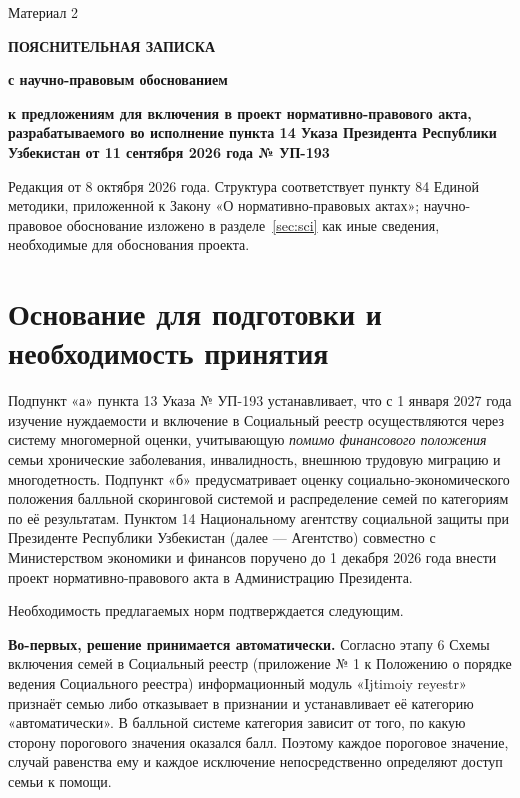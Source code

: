 \documentclass[14pt,a4paper]{extarticle}
\begin{document}
\begin{flushright}Материал 2\end{flushright}
\begin{center}\textbf{ПОЯСНИТЕЛЬНАЯ ЗАПИСКА}\par
\textbf{с научно-правовым обоснованием}\par
\textbf{к предложениям для включения в проект нормативно-правового акта, разрабатываемого во исполнение пункта 14 Указа Президента Республики Узбекистан от 11 сентября 2026 года № УП-193}\end{center}

\noindent Редакция от 8 октября 2026 года. Структура соответствует пункту 84 Единой методики, приложенной к Закону «О нормативно-правовых актах»; научно-правовое обоснование изложено в разделе~\ref{sec:sci} как иные сведения, необходимые для обоснования проекта.

\section{Основание для подготовки и необходимость принятия}\label{sec:basis}
Подпункт «а» пункта 13 Указа № УП-193 устанавливает, что с 1 января 2027 года изучение нуждаемости и включение в Социальный реестр осуществляются через систему многомерной оценки, учитывающую \textit{помимо финансового положения} семьи хронические заболевания, инвалидность, внешнюю трудовую миграцию и многодетность. Подпункт «б» предусматривает оценку социально-экономического положения балльной скоринговой системой и распределение семей по категориям по её результатам. Пунктом 14 Национальному агентству социальной защиты при Президенте Республики Узбекистан (далее — Агентство) совместно с Министерством экономики и финансов поручено до 1 декабря 2026 года внести проект нормативно-правового акта в Администрацию Президента\cite{pf193}.

Необходимость предлагаемых норм подтверждается следующим.

\textbf{Во-первых, решение принимается автоматически.} Согласно этапу 6 Схемы включения семей в Социальный реестр (приложение № 1 к Положению о порядке ведения Социального реестра) информационный модуль «Ijtimoiy reyestr» признаёт семью либо отказывает в признании и устанавливает её категорию «автоматически»\cite{res35}. В балльной системе категория зависит от того, по какую сторону порогового значения оказался балл. Поэтому каждое пороговое значение, случай равенства ему и каждое исключение непосредственно определяют доступ семьи к помощи.
\end{document}
